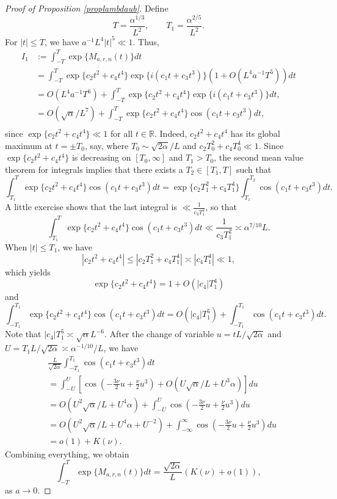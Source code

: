\documentclass[11pt]{amsart}
\begin{document}
\begin{proof}[Proof of Proposition \ref{proplambdaub}]
Define
$$
T=\frac{\alpha^{1/3}}{L^2}, \qquad T_1 = \frac{\alpha^{2/5}}{L^2}.
$$
For $|t|\le T$, we have $a^{-1}  L^4 |t|^5 \ll 1$. Thus,
\begin{equation*}
\begin{split}
 I_1 & := \int_{-T}^T \exp\{ M_{a,r,n}(t) \} dt   \\
& =\int_{-T}^T \exp\{c_2 t^2 + c_4 t^4\} \exp\{i(c_1 t + c_3 t^3)\} (1+O(L^4 a^{-1} T^5)) dt \\
& = O(L^4  a^{-1}  T^6)+ \int_{-T}^T \exp\{c_2 t^2 + c_4 t^4\}\exp\{i(c_1 t + c_3 t^3)\} dt, \\
& = O(\sqrt{\alpha}/L^7)+ \int_{-T}^T \exp\{c_2 t^2 + c_4 t^4\} \cos(c_1 t + c_3 t^3) dt, \\
\end{split}
\end{equation*}
since $ \exp\{c_2 t^2 + c_4 t^4\} \ll 1$ for all $t\in \mathbb{R}$.
Indeed, $c_2 t^2 + c_4 t^4$ has its global maximum at $t=\pm T_0$, say, where $T_0 \sim  \sqrt{2\alpha}/L$ and 
$c_2 T_0^2 +c_4 T_0^4 \ll 1$. 
Since $ \exp\{c_2 t^2 + c_4 t^4\}$ is decreasing on $[T_0, \infty]$ and $T_1>T_0$, the second mean value theorem for integrals 
implies that there exists a $T_2 \in [T_1,T]$ such that
$$
\int_{T_1}^T \exp\{c_2 t^2 + c_4 t^4\} \cos(c_1 t + c_3 t^3) dt
= \exp\{c_2 T_1^2 + c_4 T_1^4\} \int_{T_1}^{T_2} \cos(c_1 t + c_3 t^3) dt.
$$
A little exercise shows that the last integral is $\ll \frac{1}{c_3 T_1^2}$, so that 
$$
\int_{T_1}^T \exp\{c_2 t^2 + c_4 t^4\} \cos(c_1 t + c_3 t^3) dt \ll \frac{ 1}{c_3 T_1^2}\asymp \alpha^{7/10}L .
$$
When $|t| \le T_1$, we have
$$
|c_2 t^2 + c_4 t^4| \le |c_2 T_1^2 + c_4 T_1^4|  \asymp |c_4 T_1^4| \ll 1,
$$
which yields
$$
\exp\{c_2 t^2 + c_4 t^4\} = 1+ O( |c_4| T_1^4) 
$$
and
$$
 \int_{-T_1}^{T_1} \exp\{c_2 t^2 + c_4 t^4\} \cos(c_1 t + c_3 t^3) dt = O(|c_4| T_1^5)+ \int_{-T_1}^{T_1} \cos(c_1 t + c_3 t^3) dt .
$$
Note that $|c_4| T_1^5 \asymp \sqrt{\alpha} L^{-6}$. 
After the change of variable $u=t L/\sqrt{2 \alpha}$ and $U=T_1 L/\sqrt{2 \alpha} \asymp \alpha^{-1/10} /L$, 
 we have
\begin{equation*}
\begin{split}
&\frac{L}{\sqrt{2\alpha}}\int_{-T_1}^{T_1} \cos(c_1 t + c_3 t^3) dt\\
& =  \int_{-U}^U \left[\cos\left( -\frac{3\nu}{2}u +\frac{\nu}{2}u^3 \right) +O(U\sqrt{\alpha}/L+U^3 \alpha)\right] du\\
 & = O(  U^2 \sqrt{\alpha}/L + U^4 \alpha)+  \int_{-U}^U \cos\left( -\frac{3\nu}{2}u +\frac{\nu}{2}u^3 \right) du\\
 & = O(U^2 \sqrt{\alpha}/L  + U^4 \alpha +U^{-2})+  \int_{-\infty}^\infty \cos\left( -\frac{3\nu}{2}u +\frac{\nu}{2}u^3 \right) du\\
 &  = o(1)+  K(\nu).
\end{split}
\end{equation*}
Combining everything, we obtain
$$
  \int_{-T}^T \exp\{ M_{a,r,n}(t) \} dt = \frac{\sqrt{2\alpha}}{L} ( K(\nu) + o(1)),
$$
as $a \to 0$. 


\end{proof}
\end{document}
